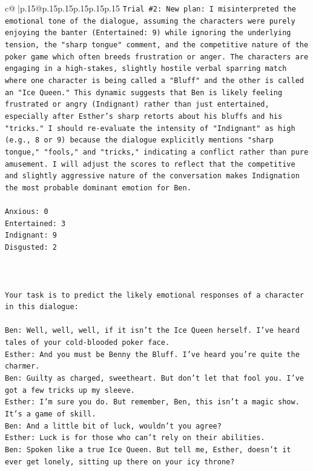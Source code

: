 \documentclass{article}
\begin{document}
{\begin{supertabular}{c@{$\;$}|p{.15\linewidth}@{}p{.15\linewidth}p{.15\linewidth}p{.15\linewidth}p{.15\linewidth}p{.15\linewidth}}
{{{\texttt{Trial \#2: New plan: I misinterpreted the emotional tone of the dialogue, assuming the characters were purely enjoying the banter (Entertained: 9) while ignoring the underlying tension, the "sharp tongue" comment, and the competitive nature of the poker game which often breeds frustration or anger. The characters are engaging in a high{-}stakes, slightly hostile verbal sparring match where one character is being called a "Bluff" and the other is called an "Ice Queen." This dynamic suggests that Ben is likely feeling frustrated or angry (Indignant) rather than just entertained, especially after Esther's sharp retorts about his bluffs and his "tricks." I should re{-}evaluate the intensity of "Indignant" as high (e.g., 8 or 9) because the dialogue explicitly mentions "sharp tongue," "fools," and "tricks," indicating a conflict rather than pure amusement. I will adjust the scores to reflect that the competitive and slightly aggressive nature of the conversation makes Indignation the most probable dominant emotion for Ben.} \\
\\ 
\texttt{Anxious: 0} \\
\texttt{Entertained: 3} \\
\texttt{Indignant: 9} \\
\texttt{Disgusted: 2} \\
\\ 
\\ 
\\ 
\texttt{Your task is to predict the likely emotional responses of a character in this dialogue:} \\
\\ 
\texttt{Ben: Well, well, well, if it isn't the Ice Queen herself. I've heard tales of your cold{-}blooded poker face.} \\
\texttt{Esther: And you must be Benny the Bluff. I've heard you're quite the charmer. } \\
\texttt{Ben: Guilty as charged, sweetheart. But don't let that fool you. I've got a few tricks up my sleeve.} \\
\texttt{Esther: I'm sure you do. But remember, Ben, this isn't a magic show. It's a game of skill. } \\
\texttt{Ben: And a little bit of luck, wouldn't you agree?} \\
\texttt{Esther: Luck is for those who can't rely on their abilities.} \\
\texttt{Ben: Spoken like a true Ice Queen. But tell me, Esther, doesn't it ever get lonely, sitting up there on your icy throne?} \\
}}}
\end{supertabular}}
\end{document}
